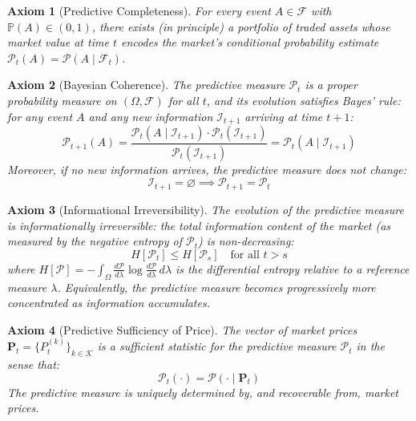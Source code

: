\documentclass[12pt,a4paper]{article}
\newtheorem{axiom}{Axiom}
\theoremstyle{definition}
\newcommand{\Prob}{\mathbb{P}}
\newcommand{\F}{\mathcal{F}}
\newcommand{\I}{\mathcal{I}}
\newcommand{\PP}{\mathcal{P}}
\begin{document}
\begin{axiom}[Predictive Completeness]\label{ax:completeness}
For every event $A \in \F$ with $\Prob(A) \in (0,1)$, there exists (in principle) a portfolio of traded assets whose market value at time $t$ encodes the market's conditional probability estimate $\PP_t(A) = \PP(A \mid \F_t)$.
\end{axiom}

\begin{axiom}[Bayesian Coherence]\label{ax:coherence}
The predictive measure $\PP_t$ is a proper probability measure on $(\Omega, \F)$ for all $t$, and its evolution satisfies Bayes' rule: for any event $A$ and any new information $\I_{t+1}$ arriving at time $t+1$:
\begin{equation}\label{eq:bayes_update}
    \PP_{t+1}(A) = \frac{\PP_t(A \mid \I_{t+1}) \cdot \PP_t(\I_{t+1})}{\PP_t(\I_{t+1})} = \PP_t(A \mid \I_{t+1})
\end{equation}
Moreover, if no new information arrives, the predictive measure does not change:
\begin{equation}
    \I_{t+1} = \varnothing \implies \PP_{t+1} = \PP_t
\end{equation}
\end{axiom}

\begin{axiom}[Informational Irreversibility]\label{ax:irreversibility}
The evolution of the predictive measure is informationally irreversible: the total information content of the market (as measured by the negative entropy of $\PP_t$) is non-decreasing:
\begin{equation}\label{eq:irreversibility}
    H[\PP_t] \leq H[\PP_s] \quad \text{for all } t > s
\end{equation}
where $H[\PP] = -\int_\Omega \frac{d\PP}{d\lambda} \log \frac{d\PP}{d\lambda} \, d\lambda$ is the differential entropy relative to a reference measure $\lambda$. Equivalently, the predictive measure becomes progressively more concentrated as information accumulates.
\end{axiom}

\begin{axiom}[Predictive Sufficiency of Price]\label{ax:sufficiency}
The vector of market prices $\mathbf{P}_t = \{P_t^{(k)}\}_{k \in \mathcal{K}}$ is a sufficient statistic for the predictive measure $\PP_t$ in the sense that:
\begin{equation}\label{eq:price_sufficiency}
    \PP_t(\cdot) = \PP(\cdot \mid \mathbf{P}_t)
\end{equation}
The predictive measure is uniquely determined by, and recoverable from, market prices.
\end{axiom}
\end{document}
